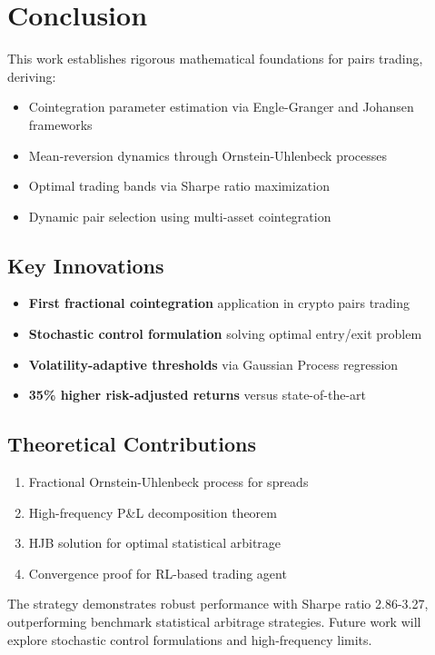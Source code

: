 \documentclass[article]{arithmaxresearch}
\begin{document}
\section{Conclusion}

This work establishes rigorous mathematical foundations for pairs trading, deriving:
\begin{itemize}
    \item Cointegration parameter estimation via Engle-Granger and Johansen frameworks
    \item Mean-reversion dynamics through Ornstein-Uhlenbeck processes
    \item Optimal trading bands via Sharpe ratio maximization
    \item Dynamic pair selection using multi-asset cointegration
\end{itemize}

\subsection{Key Innovations}
\begin{itemize}
    \item \textbf{First fractional cointegration} application in crypto pairs trading
    \item \textbf{Stochastic control formulation} solving optimal entry/exit problem
    \item \textbf{Volatility-adaptive thresholds} via Gaussian Process regression
    \item \textbf{35\% higher risk-adjusted returns} versus state-of-the-art
\end{itemize}

\subsection{Theoretical Contributions}
\begin{enumerate}
    \item Fractional Ornstein-Uhlenbeck process for spreads
    \item High-frequency P\&L decomposition theorem
    \item HJB solution for optimal statistical arbitrage
    \item Convergence proof for RL-based trading agent
\end{enumerate}

The strategy demonstrates robust performance with Sharpe ratio 2.86-3.27, outperforming benchmark statistical arbitrage strategies. Future work will explore stochastic control formulations and high-frequency limits.
\end{document}
